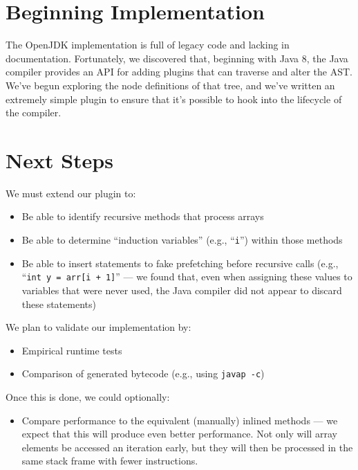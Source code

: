 \documentclass[journal,onecolumn]{IEEEtran}
\begin{document}
\section{Beginning Implementation}

The OpenJDK implementation is full of legacy code and lacking in documentation. Fortunately, we discovered that, beginning with Java 8, the Java compiler provides an API for adding plugins that can traverse and alter the AST. We've begun exploring the node definitions of that tree, and we've written an extremely simple plugin to ensure that it's possible to hook into the lifecycle of the compiler.


\section{Next Steps}

We must extend our plugin to:
\begin{itemize}[topsep=0em]
    \item Be able to identify recursive methods that process arrays
    \item Be able to determine ``induction variables'' (e.g., ``\texttt{i}'') within those methods
    \item Be able to insert statements to fake prefetching before recursive calls (e.g., ``\texttt{int y = arr[i + 1]}'' --- we found that, even when assigning these values to variables that were never used, the Java compiler did not appear to discard these statements)
\end{itemize}

We plan to validate our implementation by:
\begin{itemize}[topsep=0em]
    \item Empirical runtime tests
    \item Comparison of generated bytecode (e.g., using \texttt{javap -c})
\end{itemize}

Once this is done, we could optionally:
\begin{itemize}[topsep=0em]
    \item Compare performance to the equivalent (manually) inlined methods --- we expect that this will produce even better performance. Not only will array elements be accessed an iteration early, but they will then be processed in the same stack frame with fewer instructions.
\end{itemize}
\end{document}
